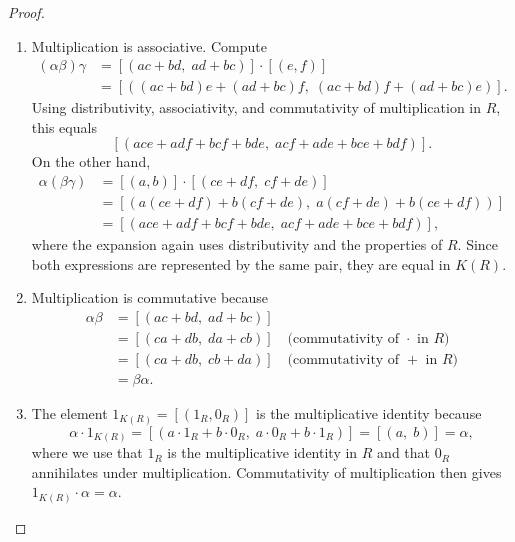 \begin{proof}
\begin{enumerate}
    \item Multiplication is associative. Compute
    \begin{align*}
    (\alpha \beta) \gamma &= [(ac+bd,\; ad+bc)] \cdot [(e,f)] \\
    &= [((ac+bd)e + (ad+bc)f,\; (ac+bd)f + (ad+bc)e)].
    \end{align*}
    Using distributivity, associativity, and commutativity of multiplication in $R$, this equals
    $$[(ace + adf + bcf + bde,\; acf + ade + bce + bdf)].$$
    On the other hand,
    \begin{align*}
    \alpha (\beta \gamma) &= [(a,b)] \cdot [(ce + df,\; cf + de)] \\
    &= [(a(ce+df) + b(cf+de),\; a(cf+de) + b(ce+df))] \\
    &= [(ace + adf + bcf + bde,\; acf + ade + bce + bdf)],
    \end{align*}
    where the expansion again uses distributivity and the properties of $R$. Since both expressions are represented by the same pair, they are equal in $K(R)$.

    \item Multiplication is commutative because
    \begin{align*}
    \alpha \beta &= [(ac+bd,\; ad+bc)] \\
    &= [(ca+db,\; da+cb)] \quad\text{(commutativity of $\cdot$ in $R$)}\\
    &= [(ca+db,\; cb+da)] \quad\text{(commutativity of $+$ in $R$)}\\
    &= \beta \alpha.
    \end{align*}

    \item The element $1_{K(R)} = [(1_R, 0_R)]$ is the multiplicative identity because
    $$\alpha \cdot 1_{K(R)} = [(a \cdot 1_R + b \cdot 0_R,\; a \cdot 0_R + b \cdot 1_R)] = [(a,\; b)] = \alpha,$$
    where we use that $1_R$ is the multiplicative identity in $R$ and that $0_R$ annihilates under multiplication. Commutativity of multiplication then gives $1_{K(R)} \cdot \alpha = \alpha$.


\end{enumerate}
\end{proof}
